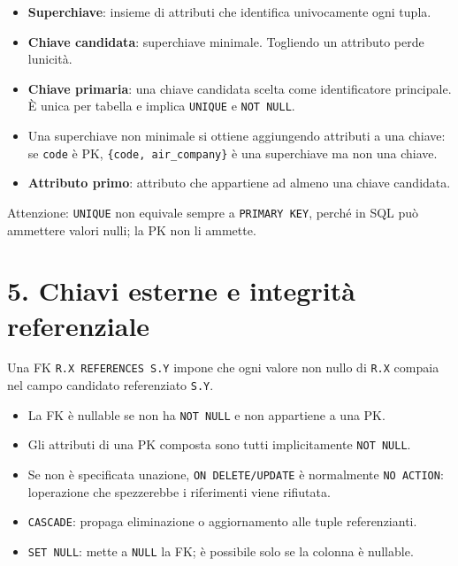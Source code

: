 \documentclass[
  10pt,
  a4paper,
]{article}
\providecommand{\tightlist}{%
  \setlength{\itemsep}{0pt}\setlength{\parskip}{0pt}}
\begin{document}
\begin{itemize}
\tightlist
\item
  \textbf{Superchiave}: insieme di attributi che identifica univocamente
  ogni tupla.
\item
  \textbf{Chiave candidata}: superchiave minimale. Togliendo un
  attributo perde l\textquotesingle unicità.
\item
  \textbf{Chiave primaria}: una chiave candidata scelta come
  identificatore principale. È unica per tabella e implica
  \texttt{UNIQUE} e \texttt{NOT\ NULL}.
\item
  Una superchiave non minimale si ottiene aggiungendo attributi a una
  chiave: se \texttt{code} è PK, \texttt{\{code,\ air\_company\}} è una
  superchiave ma non una chiave.
\item
  \textbf{Attributo primo}: attributo che appartiene ad almeno una
  chiave candidata.
\end{itemize}

Attenzione: \texttt{UNIQUE} non equivale sempre a \texttt{PRIMARY\ KEY},
perché in SQL può ammettere valori nulli; la PK non li ammette.

\section{5. Chiavi esterne e integrità
referenziale}\label{5-chiavi-esterne-e-integrituxe0-referenziale}

Una FK \texttt{R.X\ REFERENCES\ S.Y} impone che ogni valore non nullo di
\texttt{R.X} compaia nel campo candidato referenziato \texttt{S.Y}.

\begin{itemize}
\tightlist
\item
  La FK è nullable se non ha \texttt{NOT\ NULL} e non appartiene a una
  PK.
\item
  Gli attributi di una PK composta sono tutti implicitamente
  \texttt{NOT\ NULL}.
\item
  Se non è specificata un\textquotesingle azione,
  \texttt{ON\ DELETE/UPDATE} è normalmente \texttt{NO\ ACTION}:
  l\textquotesingle operazione che spezzerebbe i riferimenti viene
  rifiutata.
\item
  \texttt{CASCADE}: propaga eliminazione o aggiornamento alle tuple
  referenzianti.
\item
  \texttt{SET\ NULL}: mette a \texttt{NULL} la FK; è possibile solo se
  la colonna è nullable.
\end{itemize}
\end{document}
